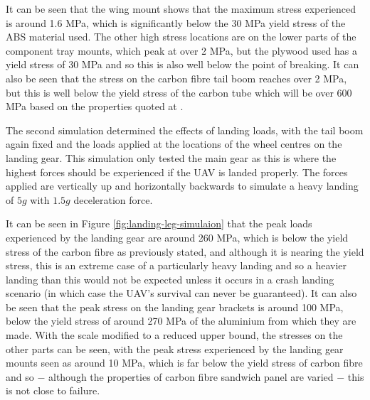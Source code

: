 \documentclass[../../main.tex]{subfiles}
\begin{document}

It can be seen that the wing mount shows that the maximum stress experienced is around 1.6 MPa, which is significantly below the 30 MPa yield stress of the ABS material used.
The other high stress locations are on the lower parts of the component tray mounts, which peak at over 2 MPa, but the plywood used has a yield stress of 30 MPa and so this is also well below the point of breaking.
It can also be seen that the stress on the carbon fibre tail boom reaches over 2 MPa, but this is well below the yield stress of the carbon tube which will be over 600 MPa based on the properties quoted at \cite{unknown}. %

The second simulation determined the effects of landing loads, with the tail boom again fixed and the loads applied at the locations of the wheel centres on the landing gear.
This simulation only tested the main gear as this is where the highest forces should be experienced if the UAV is landed properly.
The forces applied are  vertically up and  horizontally backwards to simulate a heavy landing of $5g$ with $1.5g$ deceleration force. 


It can be seen in Figure \ref{fig:landing-leg-simulaion} that the peak loads experienced by the landing gear are around 260 MPa, which is below the yield stress of the carbon fibre as previously stated, and although it is nearing the yield stress, this is an extreme case of a particularly heavy landing and so a heavier landing than this would not be expected unless it occurs in a crash landing scenario (in which case the UAV's survival can never be guaranteed).
It can also be seen that the peak stress on the landing gear brackets is around 100 MPa, below the yield stress of around 270 MPa of the aluminium from which they are made.
With the scale modified to a reduced upper bound, the stresses on the other parts can be seen, with the peak stress experienced by the landing gear mounts seen as around 10 MPa, which is far below the yield stress of carbon fibre and so $-$ although the properties of carbon fibre sandwich panel are varied $-$ this is not close to failure. 
\end{document}
